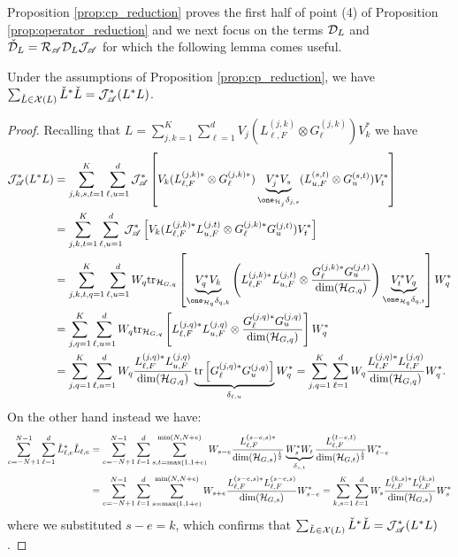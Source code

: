 \documentclass[aihp,12pt]{imsart}
\begin{document}
Proposition \ref{prop:cp_reduction} proves the first half of point (4) of Proposition \ref{prop:operator_reduction} and we next focus on the terms $\mathcal{D}_L$ and $\check{\mathcal{D}}_L = \mathcal{R}_{\mathscr{A}}\mathcal{D}_L\mathcal{J}_{\mathscr{A}}$ for which the following lemma comes useful.
\begin{lemma}
\label{lem:operator_reduction_dissipative}
    Under the assumptions of Proposition \ref{prop:cp_reduction}, we have $\sum_{\check{L}\in\mathcal{X}(L)}\check{L}^* \check{L} = \mathcal{J}_{\mathscr{A}}^*(L^* L)$.
\end{lemma}
\begin{proof}
Recalling that $L =\sum_{j,k=1}^K\sum_{\ell=1}^d V_j (L_{\ell,F}^{(j,k)}\otimes G_{\ell}^{(j,k)}) V_k^*$  we have 
\begin{align*}
    \Jc_\As^*(L^* L) &=\sum_{j,k,s,t=1}^K\sum_{\ell,u=1}^d \Jc_\As^* \left[V_k (L_{\ell,F}^{(j,k)*}\otimes G_{\ell}^{(j,k)*}) \underbrace{V_j^* V_s}_{\one_{\Hc_j}\delta_{j,s}} (L_{u,F}^{(s,t)}\otimes G_{u}^{(s,t)}) V_t^*\right] \\
    &=\sum_{j,k,t=1}^K\sum_{\ell,u=1}^d \Jc_\As^*\left[V_k (L_{\ell,F}^{(j,k)*}L_{u,F}^{(j,t)}\otimes G_{\ell}^{(j,k)*}G_{u}^{(j,t)}) V_t^*\right] \\
    &=\sum_{j,k,t, q=1}^K\sum_{\ell,u=1}^d W_q \tr_{\Hc_{G,q}} \left[\underbrace{V_q^* V_k}_{\one_{\Hc_q}\delta_{q,k}} \left(L_{\ell,F}^{(j,k)*}L_{u,F}^{(j,t)}\otimes \frac{G_{\ell}^{(j,k)*}G_{u}^{(j,t)}}{ \dim(\Hc_{G,q})  }\right) \underbrace{V_t^* V_q}_{\one_{\Hc_q}\delta_{q,t}}\right] W_q^* \\
    &=\sum_{j,q=1}^K\sum_{\ell,u=1}^d W_q \tr_{\Hc_{G,q}} \left[L_{\ell,F}^{(j,q)*}L_{u,F}^{(j,q)}\otimes \frac{G_{\ell}^{(j,q)*}G_{u}^{(j,q)}}{\dim(\Hc_{G,q})} \right] W_q^* \\
    &=\sum_{j,q=1}^K\sum_{\ell,u=1}^d W_q  \frac{L_{\ell,F}^{(j,q)*}L_{u,F}^{(j,q)}}{\dim(\Hc_{G,q})}\underbrace{\tr\left[ G_{\ell}^{(j,q)*}G_{u}^{(j,q)} \right]}_{\delta_{\ell,u}} W_q^* 
    =\sum_{j,q=1}^K\sum_{\ell=1}^d W_q  \frac{L_{\ell,F}^{(j,q)*}L_{\ell,F}^{(j,q)}}{\dim(\Hc_{G,q})} W_q^*.
\end{align*}
On the other hand instead we have:
\begin{align*}
    \sum_{e=-N+1}^{N-1}\sum_{\ell=1}^d {\check{L}_{\ell,e}}^* \check{L}_{\ell,e} 
    &=\sum_{e=-N+1}^{N-1} \sum_{\ell=1}^d \sum_{s,t=\max(1,1+e)}^{\min(N,N+e)} W_{s-e} \frac{L_{\ell,F}^{(s-e,s)*}}{\dim(\mathcal{H}_{G,s})^{\frac{1}{2}}} \underbrace{W_s^* W_t}_{\delta_{s,t}} \frac{L_{\ell,F}^{(t-e,t)}}{\dim(\mathcal{H}_{G,t})^{\frac{1}{2}}} W_{t-e}^* \\
    &=\sum_{e=-N+1}^{N-1} \sum_{\ell=1}^d \sum_{s=\max(1,1+e)}^{\min(N,N+e)} W_{s+e} \frac{L_{\ell,F}^{(s-e,s)*}L_{\ell,F}^{(s-e,s)}}{\dim(\mathcal{H}_{G,s})} W_{s-e}^* 
    = \sum_{k,s=1}^K \sum_{\ell=1}^d W_s \frac{L_{\ell,F}^{(k,s)*} L_{\ell,F}^{(k,s)} }{\dim(\mathcal{H}_{G,s})} W_s^* 
\end{align*}
where we substituted $s-e=k$, 
which confirms that $\sum_{\check{L}\in\mathcal{X}(L)}\check{L}^* \check{L} = \mathcal{J}_{\mathscr{A}}^*(L^* L)$. 
\end{proof}
\end{document}
